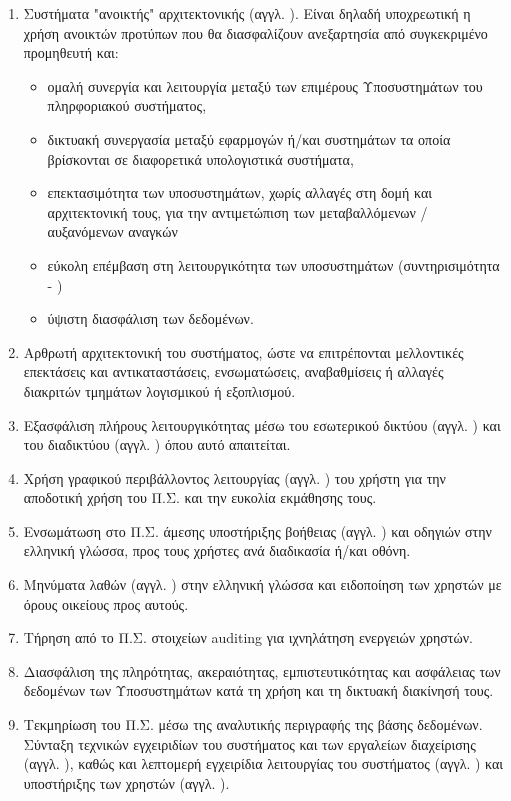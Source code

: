 \documentclass{assignment}
\begin{document}
\begin{enumerate}
\item Συστήματα "ανοικτής" αρχιτεκτονικής (αγγλ. ). Είναι δηλαδή υποχρεωτική η χρήση ανοικτών προτύπων που θα διασφαλίζουν ανεξαρτησία από συγκεκριμένο προμηθευτή και:

  \begin{itemize}
    \item ομαλή συνεργία και λειτουργία μεταξύ των επιμέρους Υποσυστημάτων του πληρφοριακού συστήματος,
    \item δικτυακή συνεργασία μεταξύ εφαρμογών ή/και συστημάτων τα οποία βρίσκονται σε διαφορετικά υπολογιστικά συστήματα,
    \item επεκτασιμότητα των υποσυστημάτων, χωρίς αλλαγές στη δομή και αρχιτεκτονική τους, για την αντιμετώπιση των μεταβαλλόμενων / αυξανόμενων αναγκών
    \item εύκολη επέμβαση στη λειτουργικότητα των υποσυστημάτων (συντηρισιμότητα - )
    \item ύψιστη διασφάλιση των δεδομένων.
  \end{itemize}

\item Αρθρωτή αρχιτεκτονική του συστήματος, ώστε να επιτρέπονται μελλοντικές επεκτάσεις και αντικαταστάσεις, ενσωματώσεις, αναβαθμίσεις ή αλλαγές διακριτών τμημάτων λογισμικού ή εξοπλισμού.

\item Εξασφάλιση πλήρους λειτουργικότητας μέσω του εσωτερικού δικτύου (αγγλ. ) και του διαδικτύου (αγγλ. ) όπου αυτό απαιτείται.

\item Χρήση γραφικού περιβάλλοντος λειτουργίας (αγγλ. ) του χρήστη για την αποδοτική χρήση του Π.Σ. και την ευκολία εκμάθησης τους.

\item Ενσωμάτωση στο Π.Σ. άμεσης υποστήριξης βοήθειας (αγγλ. ) και οδηγιών στην ελληνική γλώσσα, προς τους χρήστες ανά διαδικασία ή/και οθόνη.

\item Μηνύματα λαθών (αγγλ. ) στην ελληνική γλώσσα και ειδοποίηση των χρηστών με όρους οικείους προς αυτούς.

\item Tήρηση από το Π.Σ. στοιχείων auditing για ιχνηλάτηση
ενεργειών χρηστών.

\item Διασφάλιση της πληρότητας, ακεραιότητας, εμπιστευτικότητας και ασφάλειας των δεδομένων των Υποσυστημάτων κατά τη χρήση και τη δικτυακή διακίνησή τους.

\item Τεκμηρίωση του Π.Σ. μέσω της αναλυτικής περιγραφής της βάσης δεδομένων. Σύνταξη τεχνικών εγχειριδίων του συστήματος και των εργαλείων διαχείρισης (αγγλ. ), καθώς και λεπτομερή εγχειρίδια λειτουργίας του συστήματος (αγγλ.  ) και υποστήριξης των χρηστών (αγγλ. ).

\end{enumerate}
\end{document}
